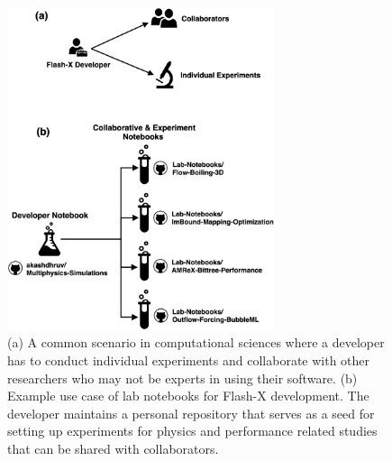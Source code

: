 \documentclass{IEEEcsmag}
\begin{document}
\begin{figure}[h]
\centerline{\includegraphics[width=18.5pc]{case-study.png}}
\caption{(a) A common scenario in computational sciences where a developer has to conduct individual experiments and collaborate with other researchers who may not be experts in using their software. (b) Example use case of lab notebooks for Flash-X development. The developer maintains a personal repository that serves as a seed for setting up experiments for physics and performance related studies that can be shared with collaborators.}%
\label{fig:case-study-example}
\end{figure}
\end{document}
